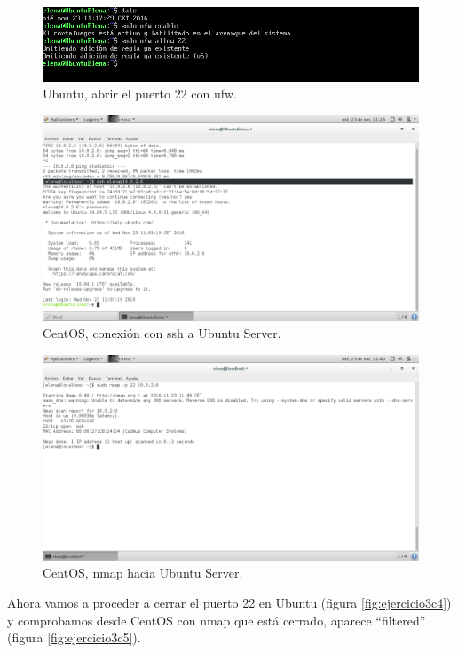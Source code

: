 \begin{figure}[H] 
	\centering
	\includegraphics[width=15cm]{./img/ejercicio3c1.png} 	
	\caption{Ubuntu, abrir el puerto 22 con ufw.} \label{fig:ejercicio3c1}
\end{figure}

\begin{figure}[H] 
	\centering
	\includegraphics[width=15cm]{./img/ejercicio3c2.png} 	
	\caption{CentOS, conexión con ssh a Ubuntu Server.} \label{fig:ejercicio3c2}
\end{figure}

\begin{figure}[H] 
	\centering
	\includegraphics[width=15cm]{./img/ejercicio3c3.png} 	
	\caption{CentOS, nmap hacia Ubuntu Server.} \label{fig:ejercicio3c3}
\end{figure}

Ahora vamos a proceder a cerrar el puerto 22 en Ubuntu (figura \ref{fig:ejercicio3c4}) y comprobamos desde CentOS con nmap que está cerrado, aparece ``filtered'' (figura \ref{fig:ejercicio3c5}).

